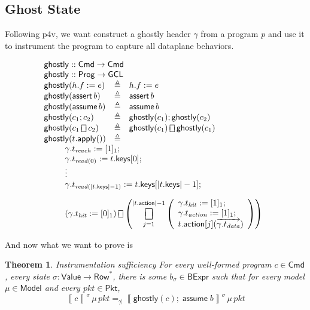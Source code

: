 \documentclass{article}
\newcommand{\pkt}{\mathit{pkt}}
\newcommand{\denote}[1]{\left\llbracket#1\right\rrbracket}
\newcommand{\Value}{\mathsf{Value}}
\newcommand{\BExpr}{\mathsf{BExpr}}
\newcommand{\Cmd}{\mathsf{Cmd}}
\newcommand{\Prog}{\mathsf{Prog}}
\newcommand{\GCL}{\mathsf{GCL}}
\newcommand{\Pkt}{\mathsf{Pkt}}
\newcommand{\Model}{\mathsf{Model}}
\newcommand{\Row}{\mathsf{Row}}
\newcommand{\action}{\mathsf{action}}
\newcommand{\keys}{\mathsf{keys}}
\newcommand{\assert}{\mathop{\mathsf{assert}}}
\newcommand{\assume}{\mathop{\mathsf{assume}}}
\newcommand{\apply}{\mathsf{apply}}
\newcommand{\choiceop}{\rotatebox[origin=c]{90}{$\sqsubset\!\!\!\sqsupset$}}
\newcommand{\choice}{\mathbin{\choiceop}}
\DeclareMathOperator*{\bigchoice}{\scalerel*{\choiceop}{\sum}}
\newcommand{\ghostly}{\mathsf{ghostly}}
\newtheorem{theorem}{Theorem}
\begin{document}
\subsection{Ghost State}


Following p4v, we want construct a ghostly header $\gamma$ from a program $p$
and use it to instrument the program to capture all dataplane behaviors.

\[
\begin{array}{l>{\triangleq}cl}
  \multicolumn{3}{l}{\ghostly :: \Cmd \to \Cmd} \\
  \multicolumn{3}{l}{\ghostly :: \Prog \to \GCL} \\
  \ghostly(h.f := e)
  && h.f := e \\
  \ghostly(\assert b)
  && \assert b\\
  \ghostly(\assume b)
  && \assume b \\
  \ghostly(c_1;c_2)
  && \ghostly(c_1);\ghostly(c_2) \\
  \ghostly(c_1\choice c_2)
  && \ghostly(c_1) \choice \ghostly(c_1)\\
  \ghostly(t.\apply())
  &&\\
  \multicolumn{3}{c}{
    \begin{array}[t]{>{\displaystyle\qquad}l}
       \gamma.t_{\mathit{reach}} := [1]_1; \\
       \gamma.t_{\mathit{read}(0)} := t.\keys[0]; \\
       \vdots \\
       \gamma.t_{\mathit{read}(|t.\keys|-1)} := t.\keys[|t.\keys|-1]; \\[1em]
       \left(\gamma.t_{\mathit{hit}} := [0]_1 \right)
       \choice \left(\bigchoice_{j = 1}^{|t.\action|-1}{
         \left(\begin{array}{l}
           \gamma.t_{\mathit{hit}} := [1]_1 ;\\
           \gamma.t_{\mathit{action}} := [1]_1;\\
           t.\action[j](\overrightarrow{\gamma.t_{\mathit{data}}})
         \end{array}\right)
       }\right)
     \end{array}}
\end{array}
\]

And now what we want to prove is

\begin{theorem}{Instrumentation sufficiency}
  For every well-formed program $c \in \Cmd$, every state $\sigma : \Value \to
  \Row^*$, there is some $b_\sigma \in \BExpr$ such that for every model $\mu
  \in \Model$ and every $\pkt \in \Pkt$,
  \[\denote{c}^\sigma\,\mu\,\pkt =_{\not\gamma} \denote{\ghostly(c);\assume b}^\sigma\,\mu\,\pkt\]
\end{theorem}
\end{document}

